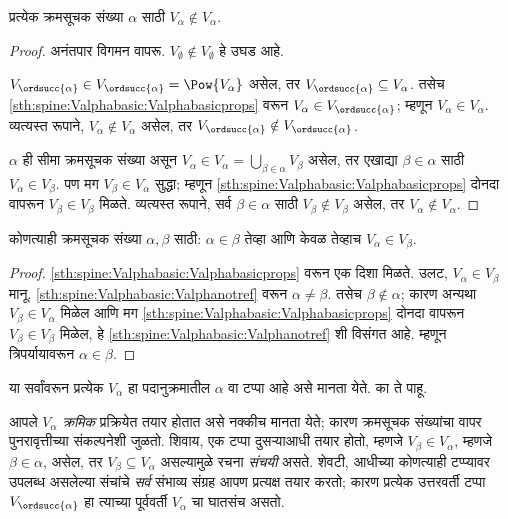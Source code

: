 \begin{lem}\label{sth:spine:Valphabasic:Valphanotref}
प्रत्येक क्रमसूचक संख्या $\alpha$ साठी $V_\alpha \notin V_\alpha$.
\end{lem}

\begin{proof}
अनंतपार विगमन वापरू. $V_\emptyset \notin V_\emptyset$ हे उघड आहे.

$V_{\ordsucc{\alpha}} \in V_{\ordsucc{\alpha}} = \Pow{V_\alpha}$ असेल, तर $V_{\ordsucc{\alpha}} \subseteq V_\alpha$. तसेच \ref{sth:spine:Valphabasic:Valphabasicprops} वरून $V_\alpha
\in V_{\ordsucc{\alpha}}$; म्हणून $V_\alpha \in V_\alpha$. व्यत्यस्त रूपाने, $V_\alpha \notin V_\alpha$ असेल, तर $V_{\ordsucc{\alpha}} \notin V_{\ordsucc{\alpha}}$.

$\alpha$ ही सीमा क्रमसूचक संख्या असून $V_\alpha \in V_\alpha = \bigcup_{\beta \in
\alpha}V_\beta$ असेल, तर एखाद्या $\beta \in \alpha$ साठी $V_\alpha \in V_\beta$. पण मग $V_\beta \in V_\alpha$ सुद्धा; म्हणून \ref{sth:spine:Valphabasic:Valphabasicprops} दोनदा वापरून $V_\beta \in V_\beta$ मिळते. व्यत्यस्त रूपाने, सर्व $\beta \in \alpha$ साठी $V_\beta \notin V_\beta$ असेल, तर $V_\alpha \notin
V_\alpha$.
\end{proof}

\begin{cor}
कोणत्याही क्रमसूचक संख्या $\alpha, \beta$ साठी: $\alpha \in \beta$ तेव्हा आणि केवळ तेव्हाच $V_\alpha \in V_\beta$.
\end{cor}

\begin{proof}
\ref{sth:spine:Valphabasic:Valphabasicprops} वरून एक दिशा मिळते. उलट, $V_\alpha \in V_\beta$ मानू. \ref{sth:spine:Valphabasic:Valphanotref} वरून $\alpha \neq \beta$. तसेच $\beta \notin \alpha$; कारण अन्यथा $V_\beta \in V_\alpha$ मिळेल आणि मग \ref{sth:spine:Valphabasic:Valphabasicprops} दोनदा वापरून $V_\beta \in V_\beta$ मिळेल, हे \ref{sth:spine:Valphabasic:Valphanotref} शी विसंगत आहे. म्हणून त्रिपर्यायावरून $\alpha \in \beta$.
\end{proof}
\noindent
या सर्वांवरून प्रत्येक $V_\alpha$ हा पदानुक्रमातील $\alpha$ वा टप्पा आहे असे मानता येते. का ते पाहू.

आपले $V_\alpha$ \emph{क्रमिक} प्रक्रियेत तयार होतात असे नक्कीच मानता येते; कारण क्रमसूचक संख्यांचा वापर पुनरावृत्तीच्या संकल्पनेशी जुळतो. शिवाय, एक टप्पा दुसऱ्याआधी तयार होतो, म्हणजे $V_\beta \in V_\alpha$, म्हणजे $\beta \in \alpha$, असेल, तर $V_\beta \subseteq V_\alpha$ असल्यामुळे रचना \emph{संचयी} असते. शेवटी, आधीच्या कोणत्याही टप्प्यावर उपलब्ध असलेल्या संचांचे \emph{सर्व} संभाव्य संग्रह आपण प्रत्यक्ष तयार करतो; कारण प्रत्येक उत्तरवर्ती टप्पा $V_{\ordsucc{\alpha}}$ हा त्याच्या पूर्ववर्ती $V_\alpha$ चा घातसंच असतो.

